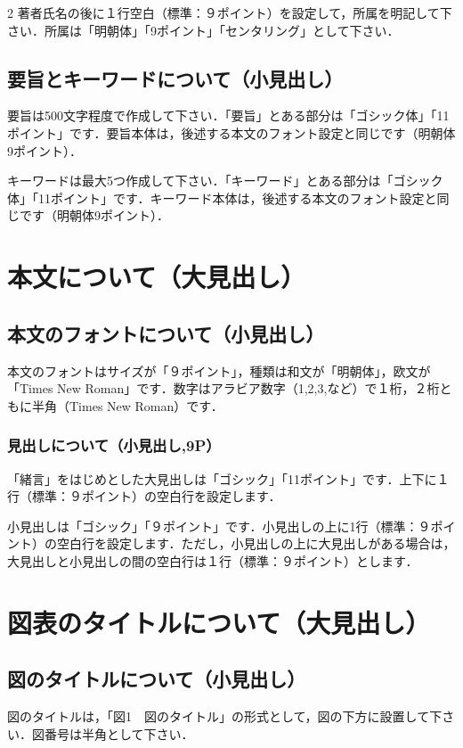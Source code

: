 \documentclass{jsaishoshiki}
\begin{document}
\begin{multicols}{2}
著者氏名の後に１行空白（標準：９ポイント）を設定して，所属を明記して下さい．所属は「明朝体」「9ポイント」「センタリング」として下さい．

\subsection{要旨とキーワードについて（小見出し）}

要旨は500文字程度で作成して下さい．「要旨」とある部分は「ゴシック体」「11ポイント」です．要旨本体は，後述する本文のフォント設定と同じです（明朝体9ポイント）．

キーワードは最大5つ作成して下さい．「キーワード」とある部分は「ゴシック体」「11ポイント」です．キーワード本体は，後述する本文のフォント設定と同じです（明朝体9ポイント）．

\section{本文について（大見出し）}
\subsection{本文のフォントについて（小見出し）}

本文のフォントはサイズが「９ポイント」，種類は和文が「明朝体」，欧文が「Times New Roman」です．数字はアラビア数字（1,2,3,など）で１桁，２桁ともに半角（Times New Roman）です．

\subsubsection{見出しについて（小見出し,9P）}
「緒言」をはじめとした大見出しは「ゴシック」「11ポイント」です．上下に１行（標準：９ポイント）の空白行を設定します．
              
小見出しは「ゴシック」「９ポイント」です．小見出しの上に1行（標準：９ポイント）の空白行を設定します．ただし，小見出しの上に大見出しがある場合は，大見出しと小見出しの間の空白行は１行（標準：９ポイント）とします．


\section{図表のタイトルについて（大見出し）}
\subsection{図のタイトルについて（小見出し）}
図のタイトルは，「図1　図のタイトル」の形式として，図の下方に設置して下さい．図番号は半角として下さい．


\end{multicols}
\end{document}
